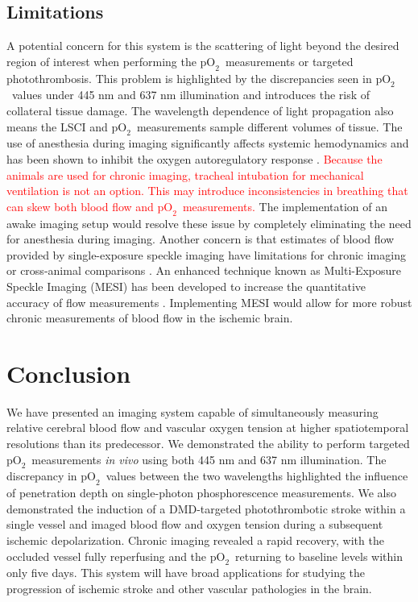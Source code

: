 \documentclass[12pt]{spieman}  %
\newcommand{\pO}{\ensuremath{\text{pO}_2}}
\begin{document}
\begin{spacing}{2}
\subsection{Limitations}
A potential concern for this system is the scattering of light beyond the desired region of interest when performing the \pO\ measurements or targeted photothrombosis. This problem is highlighted by the discrepancies seen in \pO\ values under 445 nm and 637 nm illumination and introduces the risk of collateral tissue damage. The wavelength dependence of light propagation also means the LSCI and \pO\ measurements sample different volumes of tissue. The use of anesthesia during imaging significantly affects systemic hemodynamics \cite{Janssen:2004ih} and has been shown to inhibit the oxygen autoregulatory response \cite{Aksenov:2012wh}. \textcolor{red}{Because the animals are used for chronic imaging, tracheal intubation for mechanical ventilation is not an option. This may introduce inconsistencies in breathing that can skew both blood flow and \pO\ measurements.} The implementation of an awake imaging setup \cite{Dombeck:2007gr} would resolve these issue by completely eliminating the need for anesthesia during imaging. Another concern is that estimates of blood flow provided by single-exposure speckle imaging have limitations for chronic imaging or cross-animal comparisons \cite{Kazmi:2013hp}. An enhanced technique known as Multi-Exposure Speckle Imaging (MESI) has been developed to increase the quantitative accuracy of flow measurements \cite{Parthasarathy:2008el}. Implementing MESI would allow for more robust chronic measurements of blood flow in the ischemic brain.


\section{Conclusion}
\label{sect:conclusion}
We have presented an imaging system capable of simultaneously measuring relative cerebral blood flow and vascular oxygen tension at higher spatiotemporal resolutions than its predecessor. We demonstrated the ability to perform targeted \pO\ measurements \textit{in vivo} using both 445 nm and 637 nm illumination. The discrepancy in \pO\ values between the two wavelengths highlighted the influence of penetration depth on single-photon phosphorescence measurements. We also demonstrated the induction of a DMD-targeted photothrombotic stroke within a single vessel and imaged blood flow and oxygen tension during a subsequent ischemic depolarization. Chronic imaging revealed a rapid recovery, with the occluded vessel fully reperfusing and the \pO\ returning to baseline levels within only five days. This system will have broad applications for studying the progression of ischemic stroke and other vascular pathologies in the brain.



\end{spacing}
\end{document}
